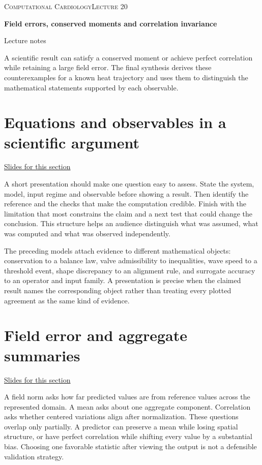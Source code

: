 \documentclass[11pt,letterpaper]{article}
\theoremstyle{definition}\newtheorem{definition}{Definition}\newtheorem{example}{Example}
\numberwithin{equation}{section}
\begin{document}
{\small\scshape Computational Cardiology\hfill Lecture 20}\par\medskip
{\raggedright{}\LARGE\bfseries\color{ink} Field errors, conserved moments and correlation invariance\par}\medskip
{\small Lecture notes}\par\bigskip
A scientific result can satisfy a conserved moment or achieve perfect correlation while retaining a large field error. The final synthesis derives these counterexamples for a known heat trajectory and uses them to distinguish the mathematical statements supported by each observable.

\section{Equations and observables in a scientific argument}
\hypertarget{note-equations-and-observables-in-a-scientific-argument}{}\label{note:equations-and-observables-in-a-scientific-argument}
{\small \href{slides.html\#frame=an-observable-selects-part-of-a-solution\&step=1}{Slides for this section}}\par
A short presentation should make one question easy to assess. State the system, model, input regime and observable before showing a result. Then identify the reference and the checks that make the computation credible. Finish with the limitation that most constrains the claim and a next test that could change the conclusion. This structure helps an audience distinguish what was assumed, what was computed and what was observed independently.

The preceding models attach evidence to different mathematical objects: conservation to a balance law, valve admissibility to inequalities, wave speed to a threshold event, shape discrepancy to an alignment rule, and surrogate accuracy to an operator and input family. A presentation is precise when the claimed result names the corresponding object rather than treating every plotted agreement as the same kind of evidence.
\section{Field error and aggregate summaries}
\hypertarget{note-field-error-and-aggregate-summaries}{}\label{note:field-error-and-aggregate-summaries}
{\small \href{slides.html\#frame=two-explicit-candidate-fields-panel-1\&step=1}{Slides for this section}}\par
A field norm asks how far predicted values are from reference values across the represented domain. A mean asks about one aggregate component. Correlation asks whether centered variations align after normalization. These questions overlap only partially. A predictor can preserve a mean while losing spatial structure, or have perfect correlation while shifting every value by a substantial bias. Choosing one favorable statistic after viewing the output is not a defensible validation strategy.
\end{document}

